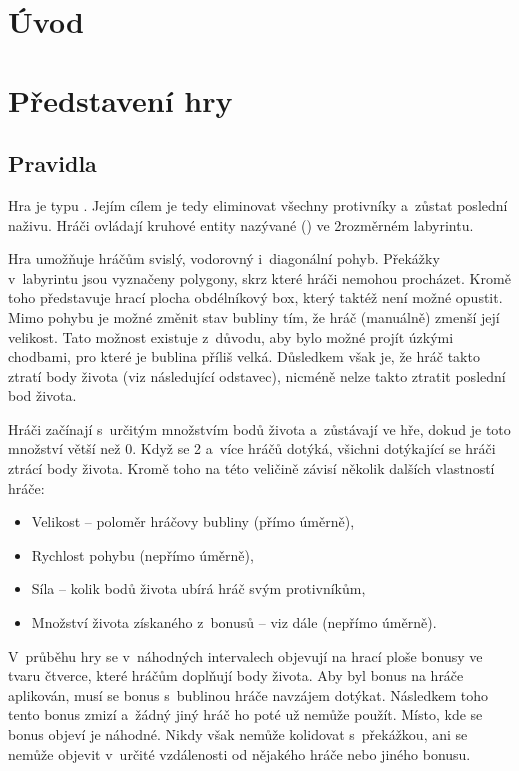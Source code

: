 \chapter{Úvod}



\chapter{Představení hry}

\section{Pravidla}
Hra je typu . Jejím cílem je tedy eliminovat všechny protivníky a~zůstat poslední naživu. Hráči ovládají kruhové entity nazývané  () ve 2rozměrném labyrintu. 

Hra umožňuje hráčům svislý, vodorovný i~diagonální pohyb. Překážky v~labyrintu jsou vyznačeny polygony, skrz které hráči nemohou procházet. Kromě toho představuje hrací plocha obdélníkový box, který taktéž není možné opustit. Mimo pohybu je možné změnit stav bubliny tím, že hráč (manuálně) zmenší její velikost. Tato možnost existuje z~důvodu, aby bylo možné projít úzkými chodbami, pro které je bublina příliš velká. Důsledkem však je, že hráč takto ztratí body života (viz následující odstavec), nicméně nelze takto ztratit poslední bod života.

Hráči začínají s~určitým množstvím bodů života a~zůstávají ve hře, dokud je toto množství větší než 0. Když se 2 a~více hráčů dotýká, všichni dotýkající se hráči ztrácí body života. Kromě toho na této veličině závisí několik dalších vlastností hráče:
\begin{itemize}
    \item Velikost -- poloměr hráčovy bubliny (přímo úměrně),
    \item Rychlost pohybu (nepřímo úměrně),
    \item Síla -- kolik bodů života ubírá hráč svým protivníkům,
    \item Množství života získaného z~bonusů -- viz dále (nepřímo úměrně).
\end{itemize}

V~průběhu hry se v~náhodných intervalech objevují na hrací ploše bonusy ve tvaru čtverce, které hráčům doplňují body života. Aby byl bonus na hráče aplikován, musí se bonus s~bublinou hráče navzájem dotýkat. Následkem toho tento bonus zmizí a~žádný jiný hráč ho poté už nemůže použít. Místo, kde se bonus objeví je náhodné. Nikdy však nemůže kolidovat s~překážkou, ani se nemůže objevit v~určité vzdálenosti od nějakého hráče nebo jiného bonusu.

